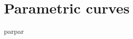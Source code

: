 \documentclass[dissertation.tex]{subfiles}
\begin{document}
\chapter{Parametric curves}
parpar
\end{document}
